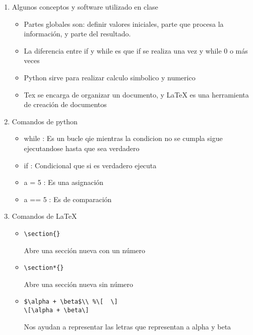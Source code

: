 \documentclass{book}
\begin{document}
\begin{enumerate}%
	\item Algunos conceptos y software utilizado en clase%
	\begin{itemize}
		\item Partes globales son: definir valores iniciales, parte que procesa la información, y parte del resultado.	
		\item La diferencia entre if y while es que if se realiza una vez y while 0 o más veces		
		\item Python sirve para realizar calculo simbolico y numerico
		\item Tex se encarga de organizar un documento, y LaTeX es una herramienta de creación de documentos
	\end{itemize}
	
	\item Comandos de python%
	\begin{itemize}%
		\item while : Es un bucle qie mientras la condicion no se cumpla sigue ejecutandose hasta que sea verdadero
		\item if : Condicional que si es verdadero ejecuta
		\item a = 5 : Es una asignación
		\item a == 5 : Es de comparación
		
		
		
	\end{itemize}%
	\item Comandos de LaTeX
	\begin{itemize}
		\item  
		\begin{lstlisting}  
\section{} 
		\end{lstlisting} Abre una sección nueva con un número
		\item 
		\begin{lstlisting}  
\section*{}
		\end{lstlisting} Abre una sección nueva sin número
		\item 
		\begin{lstlisting}  
$\alpha + \beta$\\ %\[  \]
\[\alpha + \beta\] 
		\end{lstlisting} Nos ayudan a representar las letras que representan a alpha y beta\\
		

\end{itemize}
\end{enumerate}
\end{document}
